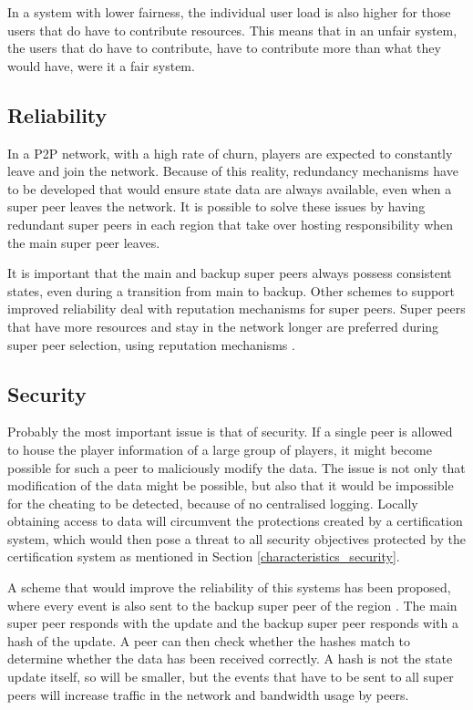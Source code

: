 In a system with lower fairness, the individual user load is also higher for those users that do have to contribute resources. This means that in an unfair system, the users that do have to contribute, have to contribute more than what they would have, were it a fair system.

\subsection{Reliability}
\label{super_peer_storage_reliability}

In a P2P network, with a high rate of churn, players are expected to constantly leave and join the network. Because of this reality, redundancy mechanisms have to be developed that would ensure state data are always available, even when a super peer leaves the network. It is possible to solve these issues by having redundant super peers in each region that take over hosting responsibility when the main super peer leaves.

It is important that the main and backup super peers always possess consistent states, even during a transition from main to backup. Other schemes to support improved reliability deal with reputation mechanisms for super peers. Super peers that have more resources and stay in the network longer are preferred during super peer selection, using reputation mechanisms \cite{fan_mediator_paper}.

\subsection{Security}

Probably the most important issue is that of security. If a single peer is allowed to house the player information of a large group of players, it might become possible for such a peer to maliciously modify the data. The issue is not only that modification of the data might be possible, but also that it would be impossible for the cheating to be detected, because of no centralised logging. Locally obtaining access to data will circumvent the protections created by a certification system, which would then pose a threat to all security objectives protected by the certification system as mentioned in Section \ref{characteristics_security}.

A scheme that would improve the reliability of this systems has been proposed, where every event is also sent to the backup super peer of the region \cite{past_storage_focus}. The main super peer responds with the update and the backup super peer responds with a hash of the update. A peer can then check whether the hashes match to determine whether the data has been received correctly. A hash is not the state update itself, so will be smaller, but the events that have to be sent to all super peers will increase traffic in the network and bandwidth usage by peers.

